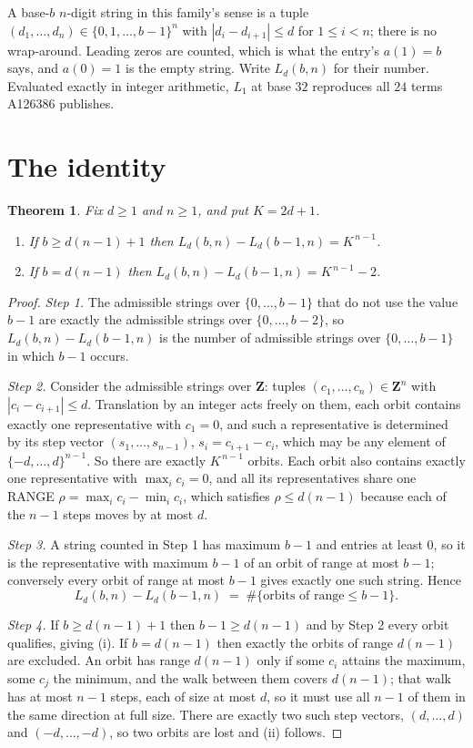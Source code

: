 \documentclass[11pt,a4paper]{article}
\theoremstyle{plain}
\newtheorem{theorem}{Theorem}
\theoremstyle{definition}
\begin{document}
A base-$b$ $n$-digit string in this family's sense is a tuple
$(d_1,\dots,d_n)\in\{0,1,\dots,b-1\}^{n}$ with $|d_i-d_{i+1}|\le d$ for $1\le i<n$; there
is no wrap-around. Leading zeros are counted, which is what the entry's $a(1)=b$ says, and
$a(0)=1$ is the empty string. Write $L_d(b,n)$ for their number. Evaluated exactly in integer
arithmetic, $L_{1}$ at base $32$ reproduces all $24$ terms A126386 publishes.

\section{The identity}

\begin{theorem}
Fix $d\ge1$ and $n\ge1$, and put $K=2d+1$.
\begin{enumerate}
\item[(i)] If $b\ge d(n-1)+1$ then $L_d(b,n)-L_d(b-1,n)=K^{\,n-1}$.
\item[(ii)] If $b=d(n-1)$ then $L_d(b,n)-L_d(b-1,n)=K^{\,n-1}-2$.
\end{enumerate}
\end{theorem}

\begin{proof}
\emph{Step 1.} The admissible strings over $\{0,\dots,b-1\}$ that do not use the value $b-1$
are exactly the admissible strings over $\{0,\dots,b-2\}$, so $L_d(b,n)-L_d(b-1,n)$ is the
number of admissible strings over $\{0,\dots,b-1\}$ in which $b-1$ occurs.

\emph{Step 2.} Consider the admissible strings over $\mathbf{Z}$: tuples
$(c_1,\dots,c_n)\in\mathbf{Z}^{n}$ with $|c_i-c_{i+1}|\le d$. Translation by an integer acts
freely on them, each orbit contains exactly one representative with $c_1=0$, and such a
representative is determined by its step vector $(s_1,\dots,s_{n-1})$, $s_i=c_{i+1}-c_i$,
which may be any element of $\{-d,\dots,d\}^{n-1}$. So there are exactly $K^{\,n-1}$ orbits.
Each orbit also contains exactly one representative with $\max_i c_i=0$, and all its
representatives share one RANGE $\rho=\max_ic_i-\min_ic_i$, which satisfies
$\rho\le d(n-1)$ because each of the $n-1$ steps moves by at most $d$.

\emph{Step 3.} A string counted in Step 1 has maximum $b-1$ and entries at least $0$, so it is
the representative with maximum $b-1$ of an orbit of range at most $b-1$; conversely every orbit
of range at most $b-1$ gives exactly one such string. Hence
\[
L_d(b,n)-L_d(b-1,n)\;=\;\#\{\text{orbits of range}\le b-1\} .
\]

\emph{Step 4.} If $b\ge d(n-1)+1$ then $b-1\ge d(n-1)$ and by Step 2 every orbit qualifies,
giving (i). If $b=d(n-1)$ then exactly the orbits of range $d(n-1)$ are excluded. An orbit has
range $d(n-1)$ only if some $c_i$ attains the maximum, some $c_j$ the minimum, and the walk
between them covers $d(n-1)$; that walk has at most $n-1$ steps, each of size at most $d$, so it
must use all $n-1$ of them in the same direction at full size. There are exactly two such step
vectors, $(d,\dots,d)$ and $(-d,\dots,-d)$, so two orbits are lost and (ii) follows.
\end{proof}
\end{document}
